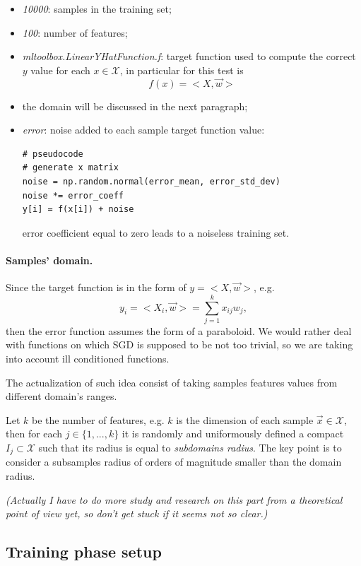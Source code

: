 \documentclass[a4paper,12pt]{article}
\theoremstyle{newplanestyle}
\theoremstyle{newdefinitionstyle}
\theoremstyle{newprovestyle}
\begin{document}
\begin{itemize}
\item \textit{10000}: samples in the training set;
\item \textit{100}: number of features;
\item \textit{mltoolbox.LinearYHatFunction.f}: target function used to compute the correct $y$ value for each $x \in \mathcal{X}$, in particular for this test is
\[f(x) = <X, \vec{w}>\]
\item the domain will be discussed in the next paragraph;
\item \textit{error}: noise added to each sample target function value:
\begin{lstlisting}
# pseudocode
# generate x matrix
noise = np.random.normal(error_mean, error_std_dev)
noise *= error_coeff
y[i] = f(x[i]) + noise
\end{lstlisting}
error coefficient equal to zero leads to a noiseless training set.
\end{itemize}

\paragraph*{Samples' domain.}
Since the target function is in the form of $y=<X,\vec{w}>$, e.g.
\begin{equation}
y_i = <X_i, \vec{w}> = \sum_{j=1}^{k}x_{ij}w_j,
\end{equation}
then the error function assumes the form of a paraboloid.
We would rather deal with functions on which SGD is supposed to be not too trivial, so we are taking into account ill conditioned functions.

The actualization  of such idea consist of taking samples features values from different domain's ranges.

Let $k$ be the number of features, e.g. $k$ is the dimension of each sample $\vec{x} \in \mathcal{X}$, then for each $j \in \{1,...,k\}$ it is randomly and uniformously defined a compact $I_j \subset \mathcal{X}$ such that its radius is equal to \textit{subdomains radius}. The key point is to consider a subsamples radius of orders of magnitude smaller than the domain radius.

\textit{(Actually I have to do more study and research on this part from a theoretical point of view yet, so don't get stuck if it seems not so clear.)} 

\subsection*{Training phase setup}
\end{document}
